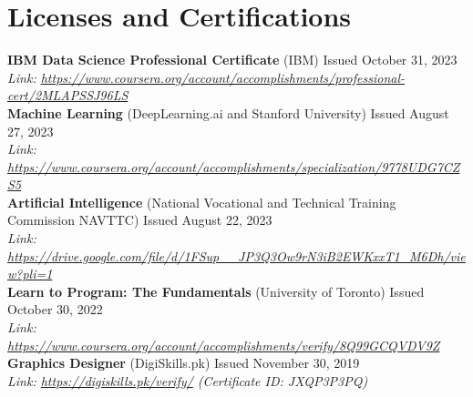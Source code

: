 \documentclass[letterpaper,11pt]{article}
\begin{document}
\section{Licenses and Certifications}
\begin{itemize}[leftmargin=0.15in, label={}]
    \small{\item{
        \textbf{IBM Data Science Professional Certificate}{ (IBM)} \hfill Issued October 31, 2023 \\
        \textit{Link: \href{https://www.coursera.org/account/accomplishments/professional-cert/2MLAPSSJ96LS}{https://www.coursera.org/account/accomplishments/professional-cert/2MLAPSSJ96LS}} \\
        \textbf{Machine Learning}{ (DeepLearning.ai and Stanford University)} \hfill Issued August 27, 2023 \\
        \textit{Link: \href{https://www.coursera.org/account/accomplishments/specialization/9778UDG7CZS5}{https://www.coursera.org/account/accomplishments/specialization/9778UDG7CZS5}} \\
        \textbf{Artificial Intelligence}{ (National Vocational and Technical Training Commission NAVTTC)} \hfill Issued August 22, 2023 \\
        \textit{Link: \href{https://drive.google.com/file/d/1FSup__JP3Q3Ow9rN3iB2EWKxxT1_M6Dh/view?pli=1}{https://drive.google.com/file/d/1FSup__JP3Q3Ow9rN3iB2EWKxxT1_M6Dh/view?pli=1}} \\
        \textbf{Learn to Program: The Fundamentals}{ (University of Toronto)} \hfill Issued October 30, 2022 \\
        \textit{Link: \href{https://www.coursera.org/account/accomplishments/verify/8Q99GCQVDV9Z}{https://www.coursera.org/account/accomplishments/verify/8Q99GCQVDV9Z}} \\
        \textbf{Graphics Designer}{ (DigiSkills.pk)} \hfill Issued November 30, 2019 \\
        \textit{Link: \href{https://digiskills.pk/verify/}{https://digiskills.pk/verify/} (Certificate ID: JXQP3P3PQ)} 
    }}
\end{itemize}
\end{document}
